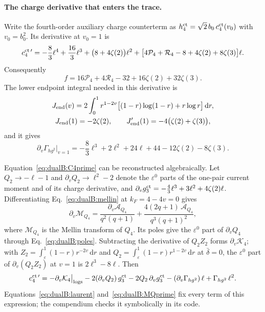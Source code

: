 \documentclass[11pt,a4paper]{article}
\numberwithin{equation}{section}
\newcommand{\dd}{\,\mathrm d}
\newcommand{\db}{\bar\delta}
\begin{document}
\paragraph{The charge derivative that enters the trace.} Write the fourth-order auxiliary charge counterterm as
$h^{\rm ct}_4=\sqrt2\,b_0\,c^{\rm ct}_4(v_0)$ with $v_0=b_0^2$. Its derivative at $v_0=1$ is
\begin{equation}
 c^{\rm ct\,\prime}_4=-\frac83\ell^4+\frac{16}{3}\ell^3+\bigl(8+4\zeta(2)\bigr)\ell^2
 +\bigl[4\mathcal P_4+\mathcal R_4-8+4\zeta(2)+8\zeta(3)\bigr]\ell.
 \label{eq:dualB:C4prime}
\end{equation}
Consequently
\begin{equation}
 f=16\mathcal P_4+4\mathcal R_4-32+16\zeta(2)+32\zeta(3).
 \label{eq:dualB:fperiod}
\end{equation}
The lower endpoint integral needed in this derivative is
\begin{equation}
\begin{gathered}
 J_{\rm end}(v)=2\int_0^1r^{1-2v}\bigl[(1-r)\log(1-r)+r\log r\bigr]\dd r,\\
 J_{\rm end}(1)=-2\zeta(2),\qquad J_{\rm end}'(1)=-4\bigl(\zeta(2)+\zeta(3)\bigr),
\end{gathered}
\end{equation}
and it gives
\begin{equation}
 \partial_v\Gamma_{hg^2}\big|_{v=1}=-\frac83\ell^3+2\ell^2+24\ell+44-12\zeta(2)-8\zeta(3).
 \label{eq:dualB:Hmixedprime}
\end{equation}

Equation~\eqref{eq:dualB:C4prime} can be reconstructed algebraically. Let $Q_2\to-\ell-1$ and
$\partial_vQ_2\to\ell^2-2$ denote the $\varepsilon^0$ parts of the one-pair current moment and of its charge
derivative, and $\partial_vg^{\rm ct}_3=-\frac43\ell^3+3\ell^2+4\zeta(2)\ell$. Differentiating
Eq.~\eqref{eq:dualB:mellin} at $k_F=4-4v=0$ gives
\begin{equation}
 \partial_v\mathcal M_{Q_4}=\frac{\partial_v\mathcal A_{Q_4}}{q^2(q+1)}+\frac{4(2q+1)\,\mathcal A_{Q_4}}{q^3(q+1)^2},
 \label{eq:dualB:MQprime}
\end{equation}
where $\mathcal M_{Q_4}$ is the Mellin transform of $Q_4$. Its poles give the $\varepsilon^0$ part of $\partial_vQ_4$
through Eq.~\eqref{eq:dualB:poles}. Subtracting the derivative of $Q_2Z_2$ forms $\partial_v\mathcal K_4$; with
$Z_2=\int_\varepsilon^1(1-r)r^{-2v}\dd r$ and $Q_2=\int_\varepsilon^1(1-r)r^{1-2v}\dd r$ at $\db=0$, the
$\varepsilon^0$ part of $\partial_v(Q_2Z_2)$ at $v=1$ is $2\ell^3-8\ell$. Then
\begin{equation}
 c^{\rm ct\,\prime}_4=-\partial_v\mathcal K_4\big|_{\rm logs}-2(\partial_vQ_2)\,g^{\rm ct}_3-2Q_2\,\partial_vg^{\rm ct}_3
 -(\partial_v\Gamma_{hg^2})\,\ell+\Gamma_{hg^2}\,\ell^2.
 \label{eq:dualB:C4prassembly}
\end{equation}
Equations~\eqref{eq:dualB:laurent} and~\eqref{eq:dualB:MQprime} fix every term of this expression; the compendium
checks it symbolically in its code.
\end{document}
